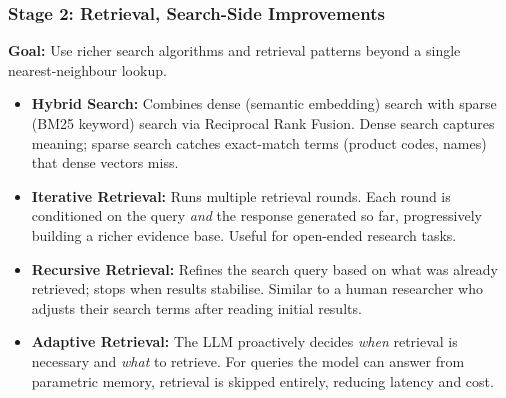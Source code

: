 \begin{frame}[fragile]\frametitle{Stage 2: Retrieval, Search-Side Improvements}

\textbf{Goal:} Use richer search algorithms and retrieval patterns beyond a single nearest-neighbour lookup.

\begin{itemize}
  \item \textbf{Hybrid Search:}
    Combines dense (semantic embedding) search with sparse (BM25 keyword) search via Reciprocal Rank Fusion. Dense search captures meaning; sparse search catches exact-match terms (product codes, names) that dense vectors miss.

  \item \textbf{Iterative Retrieval:}
    Runs multiple retrieval rounds. Each round is conditioned on the query \textit{and} the response generated so far, progressively building a richer evidence base. Useful for open-ended research tasks.

  \item \textbf{Recursive Retrieval:}
    Refines the search query based on what was already retrieved; stops when results stabilise. Similar to a human researcher who adjusts their search terms after reading initial results.

  \item \textbf{Adaptive Retrieval:}
    The LLM proactively decides \textit{when} retrieval is necessary and \textit{what} to retrieve. For queries the model can answer from parametric memory, retrieval is skipped entirely, reducing latency and cost.
\end{itemize}

\end{frame}


